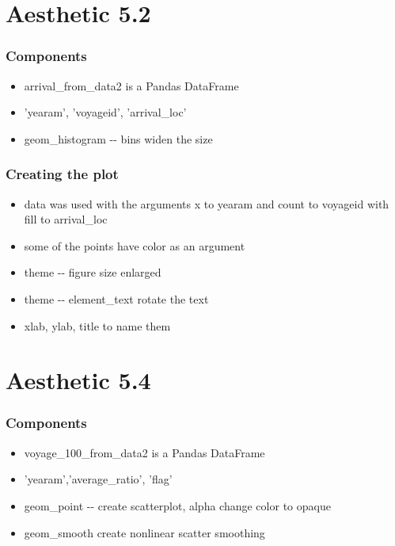 \documentclass[11pt]{article}
\providecommand{\tightlist}{%
      \setlength{\itemsep}{0pt}\setlength{\parskip}{0pt}}
\begin{document}
    \section{Aesthetic 5.2}\label{aesthetic-5.2}

\subsubsection{Components}\label{components}

\begin{itemize}
\tightlist
\item
  arrival\_from\_data2 is a Pandas DataFrame
\item
  'yearam', 'voyageid', 'arrival\_loc'
\item
  geom\_histogram -\/- bins widen the size
\end{itemize}

\subsubsection{Creating the plot}\label{creating-the-plot}

\begin{itemize}
\tightlist
\item
  data was used with the arguments x to yearam and count to voyageid
  with fill to arrival\_loc
\item
  some of the points have color as an argument
\item
  theme -\/- figure size enlarged
\item
  theme -\/- element\_text rotate the text
\item
  xlab, ylab, title to name them
\end{itemize}

\section{Aesthetic 5.4}\label{aesthetic-5.4}

\subsubsection{Components}\label{components-1}

\begin{itemize}
\tightlist
\item
  voyage\_100\_from\_data2 is a Pandas DataFrame
\item
  'yearam','average\_ratio', 'flag'
\item
  geom\_point -\/- create scatterplot, alpha change color to opaque
\item
  geom\_smooth create nonlinear scatter smoothing
\end{itemize}
\end{document}
